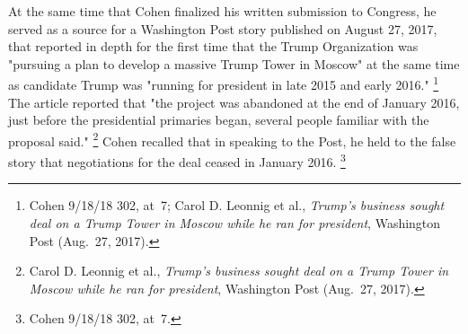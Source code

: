 {At the same time that Cohen finalized his written submission to Congress, he served as a source for a Washington Post story published on August 27, 2017, that reported in depth for the first time that the Trump Organization was "pursuing a plan to develop a massive Trump Tower in Moscow" at the same time as candidate Trump was "running for president in late 2015 and early 2016."%
\footnote{Cohen 9/18/18 302, at~7;
Carol D. Leonnig et al., \textit{Trump's business sought deal on a Trump Tower in Moscow while he ran for president}, Washington Post (Aug.~27, 2017).}
The article reported that "the project was abandoned at the end of January 2016, just before the presidential primaries began, several people familiar with the proposal said."%
\footnote{Carol D. Leonnig et al., \textit{Trump's business sought deal on a Trump Tower in Moscow while he ran for president}, Washington Post (Aug.~27, 2017).}
Cohen recalled that in speaking to the Post, he held to the false story that negotiations for the deal ceased in January 2016.%
\footnote{Cohen 9/18/18 302, at~7.}

}
